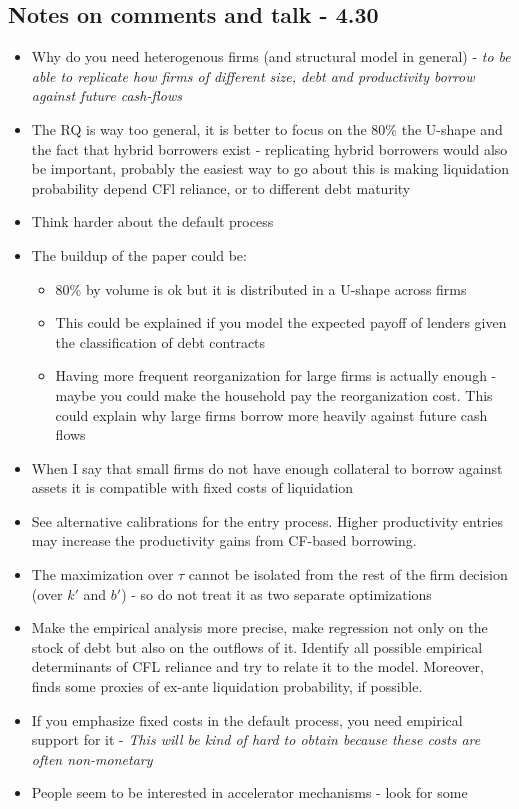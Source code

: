 \documentclass[12pt]{article}
\begin{document}
\subsection*{Notes on comments and talk - 4.30}
\begin{itemize}
    \item Why do you need heterogenous firms (and structural model in general) - \textit{to be able to replicate how firms of different size, debt and productivity borrow against future cash-flows}
    \item The RQ is way too general, it is better to focus on the 80\% the U-shape and the fact that hybrid borrowers exist - replicating hybrid borrowers would also be important, probably the easiest way to go about this is making liquidation probability depend CFl reliance, or to different debt maturity
    \item Think harder about the default process
    \item The buildup of the paper could be: 
    \begin{itemize}
        \item 80\% by volume is ok but it is distributed in a U-shape across firms 
        \item This could be explained if you model the expected payoff of lenders given the classification of debt contracts
        \item Having more frequent reorganization for large firms is actually enough - maybe you could make the household pay the reorganization cost. This could explain why large firms borrow more heavily against future cash flows 
    \end{itemize}
    \item When I say that small firms do not have enough collateral to borrow against assets it is compatible with fixed costs of liquidation
    \item See alternative calibrations for the entry process. Higher productivity entries may increase the productivity gains from CF-based borrowing. 
    \item The maximization over $\tau$ cannot be isolated from the rest of the firm decision (over $k'$ and $b'$) - so do not treat it as two separate optimizations
    \item Make the empirical analysis more precise, make regression not only on the stock of debt but also on the outflows of it. Identify all possible empirical determinants of CFL reliance and try to relate it to the model. Moreover, finds some proxies of ex-ante liquidation probability, if possible. 
    \item If you emphasize fixed costs in the default process, you need empirical support for it - \textit{This will be kind of hard to obtain because these costs are often non-monetary}
    \item People seem to be interested in accelerator mechanisms - look for some 
\end{itemize}
\end{document}
